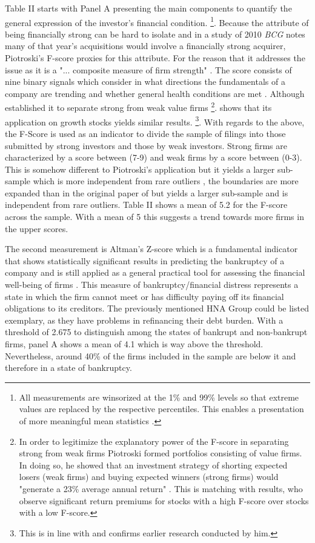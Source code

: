 \documentclass[12pt]{article}
\begin{document}
Table II starts with Panel A presenting the main components to quantify the general expression of the investor's financial condition.
	\footnote{All measurements are winsorized at the 1\% and 99\% levels so that extreme values are replaced by the respective percentiles. This enables a presentation of more meaningful mean statistics \citep{Klein2009}.}. 
Because the attribute of being financially strong can be hard to isolate and in a study of 2010 \emph{BCG} notes many of that year's acquisitions would involve a financially strong acquirer, Piotroski's F-score proxies for this attribute. For the reason that it addresses the issue as it is a "... composite measure of firm strength" \citep[p. 496]{Fama2006}. The score consists of nine binary signals which consider in what directions the fundamentals of a company are trending and whether general health conditions are met \citep{Mohr2012}. Although \citet{Piotroski2000} established it to separate strong from weak value firms
	\footnote{In order to legitimize the explanatory power of the F-score in separating strong from weak firms Piotroski formed portfolios consisting of value firms. In doing so, he showed that an investment strategy of shorting expected losers (weak firms) and buying expected winners (strong firms) would "generate a 23\% average annual return" \citep[p. 4]{Piotroski2000}. This is matching with \citet{Hyde2014} results, who observe significant return premiums for stocks with a high F-score over stocks with a low F-score.}.
\citet{Mohr2012} shows that its application on growth stocks yields similar results.
	\footnote{This is in line with \citet{Piotroski2000} and confirms earlier research conducted by him.}. 
With regards to the above, the F-Score is used as an indicator to divide the  sample of filings into those submitted by strong investors and those by weak investors. Strong firms are characterized by a score between (7-9) and weak firms by a score between (0-3). This is somehow different to Piotroski's application but it yields a larger sub-sample which is more independent from rare outliers \citep[p.12]{Mohr2012}, the boundaries are more expanded than in the original paper of \citet{Piotroski2000} but yields a  larger sub-sample and is independent from rare outliers. 
Table II shows a mean of 5.2 for the F-score across the sample. With a mean of 5 this suggests a trend towards more firms in the upper scores.

The second measurement is Altman's Z-score which is a fundamental indicator that shows statistically significant results in predicting the bankruptcy of a company \citep{Campbell2008} and is still applied as a general practical tool for assessing the financial well-being of firms \citep{Kleinert2014}. This measure of bankruptcy/financial distress represents a state in which the firm cannot meet or has difficulty paying off its financial obligations to its creditors. The previously mentioned HNA Group could be listed exemplary, as they have problems in refinancing their debt burden. With a threshold of 2.675 to distinguish among the states of bankrupt and non-bankrupt firms, panel A shows a mean of 4.1 which is way above the threshold. Nevertheless, around 40\% of the firms included in the sample are below it and therefore in a state of bankruptcy.
\end{document}
